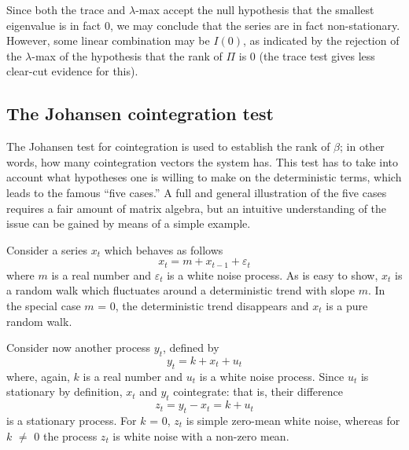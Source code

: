 Since both the trace and $\lambda$-max accept the null hypothesis that
the smallest eigenvalue is in fact 0, we may conclude that the series
are in fact non-stationary. However, some linear combination may be
$I(0)$, as indicated by the rejection of the $\lambda$-max of the
hypothesis that the rank of $\Pi$ is 0 (the trace test gives less
clear-cut evidence for this).

\subsection{The Johansen cointegration test}
\label{sec:johansen-test}

The Johansen test for cointegration is used to establish the rank of
$\beta$; in other words, how many cointegration vectors the system
has.  This test has to take into account what hypotheses one is
willing to make on the deterministic terms, which leads to the famous
``five cases.'' A full and general illustration of the five cases
requires a fair amount of matrix algebra, but an intuitive
understanding of the issue can be gained by means of a simple example.
    
Consider a series $x_t$ which behaves as follows
%      
\[ x_t = m + x_{t-1} + \varepsilon_t \] 
%
where $m$ is a real number and $\varepsilon_t$ is a white noise
process. As is easy to show, $x_t$ is a random walk which fluctuates
around a deterministic trend with slope $m$. In the special case $m$ =
0, the deterministic trend disappears and $x_t$ is a pure random walk.
    
Consider now another process $y_t$, defined by
%      
\[ y_t = k + x_t + u_t \] 
%
where, again, $k$ is a real number and $u_t$ is a white noise process.
Since $u_t$ is stationary by definition, $x_t$ and $y_t$ cointegrate:
that is, their difference
%      
\[ z_t = y_t - x_t = k + u_t \]
%	
is a stationary process. For $k$ = 0, $z_t$ is simple zero-mean white
noise, whereas for $k$ $\ne$ 0 the process $z_t$ is white noise with a
non-zero mean.
  
